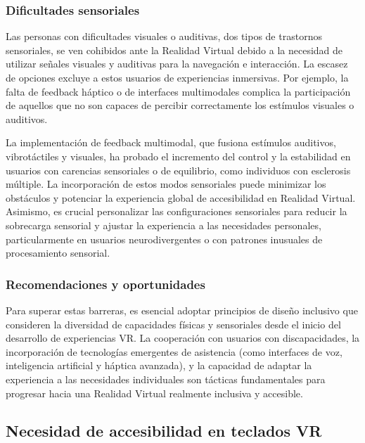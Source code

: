 \subsubsection{Dificultades sensoriales}

Las personas con dificultades visuales o auditivas, dos tipos de  trastornos sensoriales, se ven cohibidos ante la Realidad Virtual debido a la necesidad de utilizar señales visuales y auditivas para la navegación e interacción. La escasez de opciones excluye a estos usuarios de experiencias inmersivas. Por ejemplo, la falta de feedback háptico o de interfaces multimodales complica la participación de aquellos que no son capaces de percibir correctamente los estímulos visuales o auditivos. \cite{inclusive_arvr} \cite{analyzing_challenges}\cite{vr_cultural_heritage}

La implementación de feedback multimodal, que fusiona estímulos auditivos, vibrotáctiles y visuales, ha probado el incremento del control y la estabilidad en usuarios con carencias sensoriales o de equilibrio, como individuos con esclerosis múltiple. La incorporación de estos modos sensoriales puede minimizar los obstáculos y potenciar la experiencia global de accesibilidad en Realidad Virtual. Asimismo, es crucial personalizar las configuraciones sensoriales para reducir la sobrecarga sensorial y ajustar la experiencia a las necesidades personales, particularmente en usuarios neurodivergentes o con patrones inusuales de procesamiento sensorial. \cite{multimodal_feedback}\cite{neurodivergent_xr}\cite{vr_cultural_heritage}

\subsubsection{Recomendaciones y oportunidades}

Para superar estas barreras, es esencial adoptar principios de diseño inclusivo que consideren la diversidad de capacidades físicas y sensoriales desde el inicio del desarrollo de experiencias VR. La cooperación con usuarios con discapacidades, la incorporación de tecnologías emergentes de asistencia (como interfaces de voz, inteligencia artificial y háptica avanzada), y la capacidad de adaptar la experiencia a las necesidades individuales son tácticas fundamentales para progresar hacia una Realidad Virtual realmente inclusiva y accesible.

\subsection{Necesidad de accesibilidad en teclados VR}

